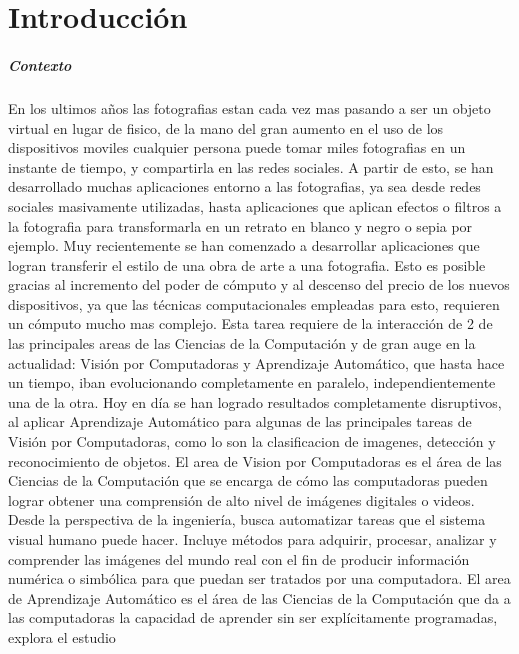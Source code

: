 \documentclass[a4paper,11pt,spanish]{book}
\begin{document}
\tableofcontents 

\chapter{Introducción}
  \paragraph{Contexto}
    En los ultimos años las fotografias estan cada vez mas pasando a ser un objeto virtual en lugar de fisico, de la mano del gran aumento en el uso de los dispositivos moviles 
    cualquier persona puede tomar miles fotografias en un instante de tiempo, y compartirla en las redes sociales.
    A partir de esto, se han desarrollado muchas aplicaciones entorno a las fotografias, ya sea desde redes sociales masivamente utilizadas, hasta aplicaciones que aplican efectos o filtros 
    a la fotografia para transformarla en un retrato en blanco y negro o sepia por ejemplo.
    Muy recientemente se han comenzado a desarrollar aplicaciones que logran transferir el estilo de una obra de arte a una fotografia. Esto es posible gracias al incremento 
    del poder de cómputo y al descenso del precio de los nuevos dispositivos, ya que las técnicas computacionales empleadas para esto, requieren un cómputo mucho mas complejo.
    Esta tarea requiere de la interacción de 2 de las principales areas de las Ciencias de la Computación y de gran auge en la actualidad: Visión por Computadoras y Aprendizaje Automático,
    que hasta hace un tiempo, iban evolucionando completamente en paralelo, independientemente una de la otra. Hoy en día se han logrado resultados completamente disruptivos, al aplicar
    Aprendizaje Automático para algunas de las principales tareas de Visión por Computadoras, como lo son la clasificacion de imagenes, detección y reconocimiento de objetos.
    El area de Vision por Computadoras es el área de las Ciencias de la Computación que se encarga de cómo las computadoras pueden lograr obtener una comprensión de alto nivel de imágenes digitales o videos. 
    Desde la perspectiva de la ingeniería, busca automatizar tareas que el sistema visual humano puede hacer. Incluye métodos para adquirir, procesar, analizar y comprender las imágenes del mundo real 
    con el fin de producir información numérica o simbólica para que puedan ser tratados por una computadora.
    El area de Aprendizaje Automático es el área de las Ciencias de la Computación que da a las computadoras la capacidad de aprender sin ser explícitamente programadas, explora el estudio 
\end{document}
